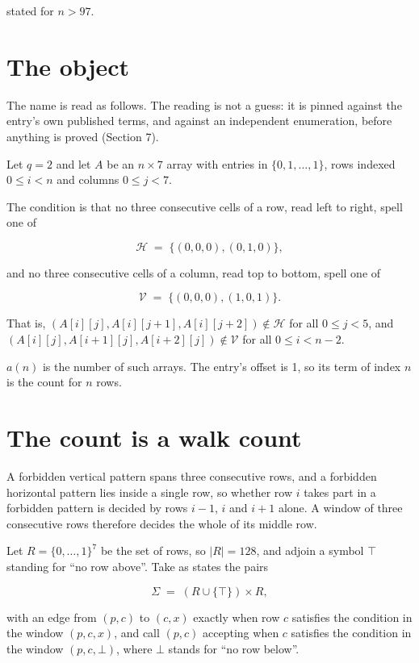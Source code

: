 \documentclass[11pt]{article}
\theoremstyle{definition}
\begin{document}
stated for $n > 97$.

\section{The object}

The name is read as follows. The reading is not a guess: it is pinned against the entry's own published terms, and against an independent enumeration, before anything is proved (Section 7).

Let $q = 2$ and let $A$ be an $n \times 7$ array with entries in $\{0,1,\dots,1\}$, rows indexed $0 \le i < n$ and columns $0 \le j < 7$.

The condition is that no three consecutive cells of a row, read left to right, spell one of

\[\mathcal{H} \;=\; \{(0,0,0), (0,1,0)\},\]

and no three consecutive cells of a column, read top to bottom, spell one of

\[\mathcal{V} \;=\; \{(0,0,0), (1,0,1)\}.\]

That is, $(A[i][j],A[i][j{+}1],A[i][j{+}2]) \notin \mathcal{H}$ for all $0 \le j < 5$, and $(A[i][j],A[i{+}1][j],A[i{+}2][j]) \notin \mathcal{V}$ for all $0 \le i < n-2$.

$a(n)$ is the number of such arrays. The entry's offset is 1, so its term of index $n$ is the count for $n$ rows.

\section{The count is a walk count}

A forbidden vertical pattern spans three consecutive rows, and a forbidden horizontal pattern lies inside a single row, so whether row $i$ takes part in a forbidden pattern is decided by rows $i-1$, $i$ and $i+1$ alone. A window of three consecutive rows therefore decides the whole of its middle row.

Let $R = \{0,\dots,1\}^{7}$ be the set of rows, so $|R| = 128$, and adjoin a symbol $\top$ standing for ``no row above''. Take as states the pairs

\[\Sigma \;=\; (R \cup \{\top\}) \times R,\]

with an edge from $(p,c)$ to $(c,x)$ exactly when row $c$ satisfies the condition in the window $(p,c,x)$, and call $(p,c)$ accepting when $c$ satisfies the condition in the window $(p,c,\bot)$, where $\bot$ stands for ``no row below''.
\end{document}
